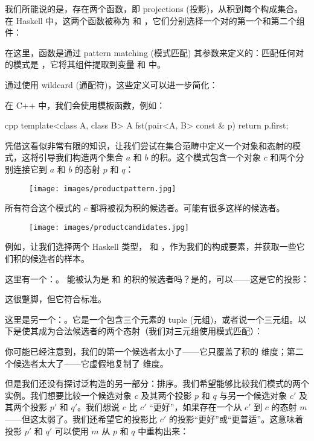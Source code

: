 我们所能说的是，存在两个函数，即 projections (投影)，从积到每个构成集合。在 Haskell 中，这两个函数被称为  和 ，它们分别选择一个对的第一个和第二个组件：


在这里，函数是通过 pattern matching (模式匹配) 其参数来定义的：匹配任何对的模式是 ，它将其组件提取到变量  和  中。

通过使用 wildcard (通配符)，这些定义可以进一步简化：

在 C++ 中，我们会使用模板函数，例如：

\begin{snip}{cpp}
template<class A, class B> A
fst(pair<A, B> const & p) {
    return p.first;
}
\end{snip}
凭借这看似非常有限的知识，让我们尝试在集合范畴中定义一个对象和态射的模式，这将引导我们构造两个集合 $a$ 和 $b$ 的积。这个模式包含一个对象 $c$ 和两个分别连接它到 $a$ 和 $b$ 的态射 $p$ 和 $q$：


\begin{figure}[H]
  \centering
  \texttt{[image: images/productpattern.jpg]}
\end{figure}

\noindent
所有符合这个模式的 $c$ 都将被视为积的候选者。可能有很多这样的候选者。

\begin{figure}[H]
  \centering
  \texttt{[image: images/productcandidates.jpg]}
\end{figure}

\noindent
例如，让我们选择两个 Haskell 类型， 和 ，作为我们的构成要素，并获取一些它们积的候选者的样本。

这里有一个：。  能被认为是  和  的积的候选者吗？是的，可以——这是它的投影：

这很蹩脚，但它符合标准。

这里是另一个：。它是一个包含三个元素的 tuple (元组)，或者说一个三元组。以下是使其成为合法候选者的两个态射（我们对三元组使用模式匹配）：

你可能已经注意到，我们的第一个候选者太小了——它只覆盖了积的  维度；第二个候选者太大了——它虚假地复制了  维度。

但是我们还没有探讨泛构造的另一部分：排序。我们希望能够比较我们模式的两个实例。我们想要比较一个候选对象 $c$ 及其两个投影 $p$ 和 $q$ 与另一个候选对象 $c'$ 及其两个投影 $p'$ 和 $q'$。我们想说 $c$ 比 $c'$ “更好”，如果存在一个从 $c'$ 到 $c$ 的态射 $m$——但这太弱了。我们还希望它的投影比 $c'$ 的投影“更好”或“更普适”。这意味着投影 $p'$ 和 $q'$ 可以使用 $m$ 从 $p$ 和 $q$ 中重构出来：

